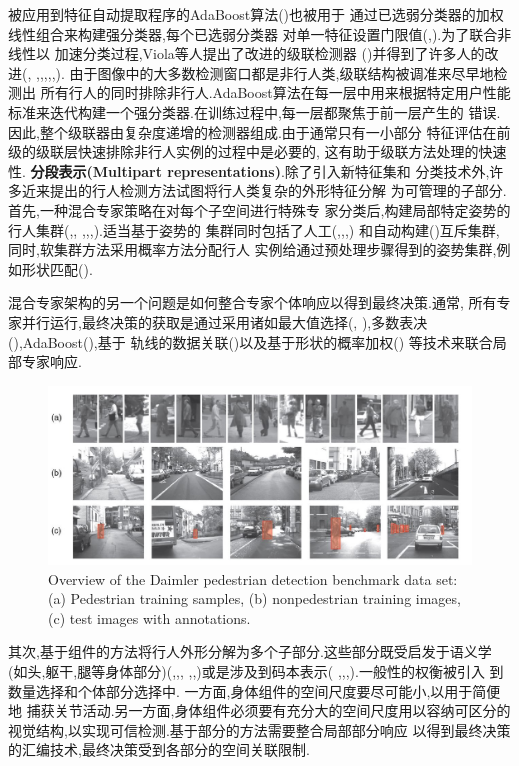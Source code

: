 \documentclass[10pt,letterpaper,journal,compsoc]{IEEEtran}
\begin{document}
被应用到特征自动提取程序的AdaBoost算法(\cite{bib18})也被用于
通过已选弱分类器的加权线性组合来构建强分类器,每个已选弱分类器
对单一特征设置门限值(\cite{bib60},\cite{bib62}).为了联合非线性以
加速分类过程,Viola等人提出了改进的级联检测器
(\cite{bib74})并得到了许多人的改进(\cite{bib45},\cite{bib52}
,\cite{bib63},\cite{bib71},\cite{bib76},\cite{bib80},\cite{bib83}).
由于图像中的大多数检测窗口都是非行人类,级联结构被调准来尽早地检测出
所有行人的同时排除非行人.AdaBoost算法在每一层中用来根据特定用户性能
标准来迭代构建一个强分类器.在训练过程中,每一层都聚焦于前一层产生的
错误.因此,整个级联器由复杂度递增的检测器组成.由于通常只有一小部分
特征评估在前级的级联层快速排除非行人实例的过程中是必要的,
这有助于级联方法处理的快速性.
\textbf{分段表示(Multipart representations)}.除了引入新特征集和
分类技术外,许多近来提出的行人检测方法试图将行人类复杂的外形特征分解
为可管理的子部分.首先,一种混合专家策略在对每个子空间进行特殊专
家分类后,构建局部特定姿势的行人集群(\cite{bib23},\cite{bib51},
\cite{bib62},\cite{bib64},\cite{bib76},\cite{bib80}).适当基于姿势的
集群同时包括了人工(\cite{bib51},\cite{bib62},\cite{bib64},\cite{bib76})
和自动构建(\cite{bib80})互斥集群,同时,软集群方法采用概率方法分配行人
实例给通过预处理步骤得到的姿势集群,例如形状匹配(\cite{bib23}).

混合专家架构的另一个问题是如何整合专家个体响应以得到最终决策.通常,
所有专家并行运行,最终决策的获取是通过采用诸如最大值选择(\cite{bib51},
\cite{bib76}),多数表决(\cite{bib64}),AdaBoost(\cite{bib62}),基于
轨线的数据关联(\cite{bib80})以及基于形状的概率加权(\cite{bib23})
等技术来联合局部专家响应.

\begin{figure}[!t]
\centering
\includegraphics[width=7in]{fig1.JPG}
\caption{Overview of the Daimler pedestrian detection benchmark data set: (a) Pedestrian training samples, (b) nonpedestrian training images, (c) test
images with annotations.}
\end{figure}

其次,基于组件的方法将行人外形分解为多个子部分.这些部分既受启发于语义学
(如头,躯干,腿等身体部分)(\cite{bib2},\cite{bib45},\cite{bib48},
\cite{bib62},\cite{bib65},\cite{bib76})或是涉及到码本表示(
\cite{bib1},\cite{bib39},\cite{bib40},\cite{bib61}).一般性的权衡被引入
到数量选择和个体部分选择中.
一方面,身体组件的空间尺度要尽可能小,以用于简便地
捕获关节活动.另一方面,身体组件必须要有充分大的空间尺度用以容纳可区分的
视觉结构,以实现可信检测.基于部分的方法需要整合局部部分响应
以得到最终决策的汇编技术,最终决策受到各部分的空间关联限制.
\end{document}
